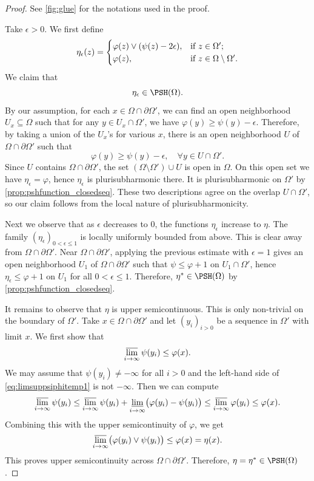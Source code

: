 \begin{proof}
See \cref{fig:glue} for the notations used in the proof.

    Take $\epsilon>0$.
    We first define
    \[
    \eta_{\epsilon}(z)=\begin{cases}
        \varphi(z)\lor (\psi(z)-2\epsilon),& \textup{if }z\in \Omega';\\
        \varphi(z),& \textup{if }z\in \Omega\setminus\Omega'.
    \end{cases}
    \]
    We claim that
    \[
    \eta_{\epsilon}\in \PSH(\Omega).
    \]
    By our assumption, for each $x\in \Omega\cap \partial \Omega'$, we can find an open neighborhood $U_x\subseteq \Omega$ such that for any $y\in U_x\cap \Omega'$, we have $\varphi(y)\geq \psi(y)-\epsilon$.
    Therefore, by taking a union of the $U_x$'s for various $x$, there is an open neighborhood $U$ of $\Omega\cap \partial \Omega'$ such that
    \[
    \varphi(y)\geq \psi(y)-\epsilon,\quad \forall y\in U\cap \Omega'.
    \]
    Since $U$ contains $\Omega\cap\partial\Omega'$, the set $(\Omega\setminus \Omega')\cup U$ is open in $\Omega$. On this open set we have $\eta_{\epsilon}=\varphi$, hence $\eta_{\epsilon}$ is plurisubharmonic there. It is plurisubharmonic on $\Omega'$ by \cref{prop:pshfunction_closedseq}. These two descriptions agree on the overlap $U\cap\Omega'$, so our claim follows from the local nature of plurisubharmonicity.

    Next we observe that as $\epsilon$ decreases to $0$, the functions $\eta_{\epsilon}$ increase to $\eta$. The family $(\eta_\epsilon)_{0<\epsilon\leq 1}$ is locally uniformly bounded from above. This is clear away from $\Omega\cap\partial\Omega'$. Near $\Omega\cap\partial\Omega'$, applying the previous estimate with $\epsilon=1$ gives an open neighborhood $U_1$ of $\Omega\cap\partial\Omega'$ such that $\psi\leq \varphi+1$ on $U_1\cap\Omega'$, hence $\eta_\epsilon\leq \varphi+1$ on $U_1$ for all $0<\epsilon\leq 1$. Therefore, $\eta^*\in \PSH(\Omega)$ by \cref{prop:pshfunction_closedseq}.

    It remains to observe that $\eta$ is upper semicontinuous. This is only non-trivial on the boundary of $\Omega'$. Take $x\in \Omega\cap \partial \Omega'$ and let $(y_i)_{i>0}$ be a sequence in $\Omega'$ with limit $x$. We first show that
    \begin{equation}\label{eq:limsuppsiphitemp1}
    \varlimsup_{i\to\infty} \psi(y_i)\leq \varphi(x).
    \end{equation}
    We may assume that $\psi(y_i)\neq -\infty$ for all $i>0$ and the left-hand side of \eqref{eq:limsuppsiphitemp1} is not $-\infty$. Then we can compute
    \[
    \varlimsup_{i\to\infty} \psi(y_i)\leq \varlimsup_{i\to\infty} \psi(y_i)+\varliminf_{i\to\infty} \bigl(\varphi(y_i)-\psi(y_i)\bigr)\leq \varlimsup_{i\to\infty}\varphi(y_i)\leq \varphi(x).
    \]
    Combining this with the upper semicontinuity of $\varphi$, we get
    \[
        \varlimsup_{i\to\infty}\bigl(\varphi(y_i)\lor\psi(y_i)\bigr)\leq \varphi(x)=\eta(x).
    \]
    This proves upper semicontinuity across $\Omega\cap\partial\Omega'$.
    Therefore, $\eta=\eta^*\in \PSH(\Omega)$.
\end{proof}

